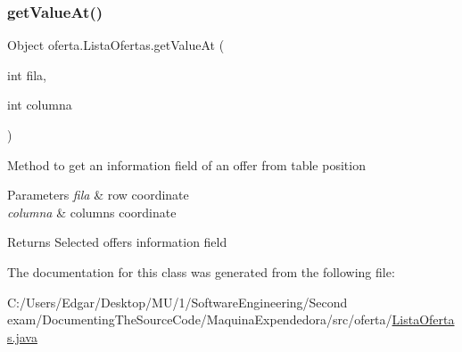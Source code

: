 \subsubsection{\texorpdfstring{get\+Value\+At()}{getValueAt()}}
{\footnotesize\ttfamily Object oferta.\+Lista\+Ofertas.\+get\+Value\+At (\begin{DoxyParamCaption}\item[{int}]{fila,  }\item[{int}]{columna }\end{DoxyParamCaption})\hspace{0.3cm}{\ttfamily [inline]}}

Method to get an information field of an offer from table position 
\begin{DoxyParams}{Parameters}
{\em fila} & row coordinate \\
\hline
{\em columna} & columns coordinate \\
\hline
\end{DoxyParams}
\begin{DoxyReturn}{Returns}
Selected offer\textquotesingle{}s information field 
\end{DoxyReturn}


The documentation for this class was generated from the following file\+:\begin{DoxyCompactItemize}
\item 
C\+:/\+Users/\+Edgar/\+Desktop/\+M\+U/1/\+Software\+Engineering/\+Second exam/\+Documenting\+The\+Source\+Code/\+Maquina\+Expendedora/src/oferta/\mbox{\hyperlink{_lista_ofertas_8java}{Lista\+Ofertas.\+java}}\end{DoxyCompactItemize}

